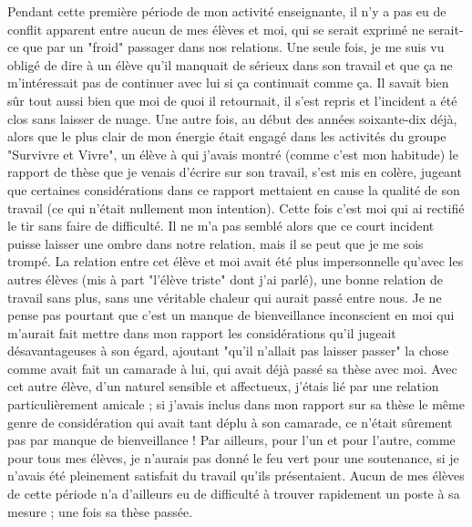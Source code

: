 Pendant cette première période de mon activité enseignante, il n'y a pas eu de conflit apparent entre aucun de mes élèves et moi, qui se serait exprimé ne serait-ce que par un "froid" passager dans nos relations. Une seule fois, je me suis vu obligé de dire à un élève qu'il manquait de sérieux dans son travail et que ça ne m'intéressait pas de continuer avec lui si ça continuait comme ça. Il savait bien sûr tout aussi bien que moi de quoi il retournait, il s'est repris et l'incident a été clos sans laisser de nuage. Une autre fois, au début des années soixante-dix déjà, alors que le plus clair de mon énergie était engagé dans les activités du groupe "Survivre et Vivre", un élève à qui j'avais montré (comme c'est mon habitude) le rapport de thèse que je venais d'écrire sur son travail, s'est mis en colère, jugeant que certaines considérations dans ce rapport mettaient en cause la qualité de son travail (ce qui n'était nullement mon intention). Cette fois c'est moi qui ai rectifié le tir sans faire de difficulté. Il ne m'a pas semblé alors que ce court incident puisse laisser une ombre dans notre relation, mais il se peut que je me sois trompé. La relation entre cet élève et moi avait été plus impersonnelle qu'avec les autres élèves (mis à part "l'élève triste" dont j'ai parlé), une bonne relation de travail sans plus, sans une véritable chaleur qui aurait passé entre nous. Je ne pense pas pourtant que c'est un manque de bienveillance inconscient en moi qui m'aurait fait mettre dans mon rapport les considérations qu'il jugeait désavantageuses à son égard, ajoutant "qu'il n'allait pas laisser passer" la chose comme avait fait un camarade à lui, qui avait déjà passé sa thèse avec moi. Avec cet autre élève, d'un naturel sensible et affectueux, j'étais lié par une relation particulièrement amicale ; si j'avais inclus dans mon rapport sur sa thèse le même genre de considération qui avait tant déplu à son camarade, ce n'était sûrement pas par manque de bienveillance ! Par ailleurs, pour l'un et pour l'autre, comme pour tous mes élèves, je n'aurais pas donné le feu vert pour une soutenance, si je n'avais été pleinement satisfait du travail qu'ils présentaient. Aucun de mes élèves de cette période n'a d'ailleurs eu de difficulté à trouver rapidement un poste à sa mesure ; une fois sa thèse passée.

